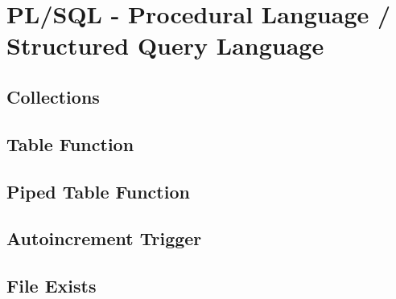 \section[PLSQL]{PL/SQL - Procedural Language / Structured Query Language}
\label{sec:plsql}

\subsection{Collections}
\label{sec:plsql.collections}

\subsection{Table Function}
\label{sec:plsql.table_function}

\subsection{Piped Table Function}
\label{sec:plsql.piped_table_function}

\subsection{Autoincrement Trigger}
\label{sec:plsql.autoincrement_trigger}

\subsection{File Exists}
\label{sec:plsql.file_exists}
